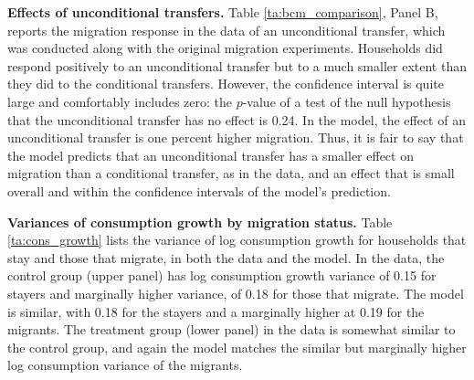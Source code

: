 \documentclass[12pt,pdftex]{article}
\begin{document}
\textbf{Effects of unconditional transfers.} Table \ref{ta:bcm_comparison}, Panel B, reports the migration response in the data of an unconditional transfer, which was conducted along with the original migration experiments.  Households did respond positively to an unconditional transfer but to a much smaller extent than they did to the conditional transfers. However, the confidence interval is quite large and comfortably includes zero: the $p$-value of a test of the null hypothesis that the unconditional transfer has no effect is 0.24. In the model, the effect of an unconditional transfer is one percent higher migration. Thus, it is fair to say that the model predicts that an unconditional transfer has a smaller effect on migration than a conditional transfer, as in the data, and an effect that is small overall and within the confidence intervals of the model's prediction.

\textbf{Variances of consumption growth by migration status.} Table \ref{ta:cons_growth} lists the variance of log consumption growth for households that stay and those that migrate, in both the data and the model. In the data, the control group (upper panel) has log consumption growth variance of 0.15 for stayers and marginally higher variance, of 0.18 for those that migrate. The model is similar, with 0.18 for the stayers and a marginally higher at 0.19 for the migrants. The treatment group (lower panel) in the data is somewhat similar to the control group, and again the model matches the similar but marginally higher log consumption variance of the migrants.
\end{document}
